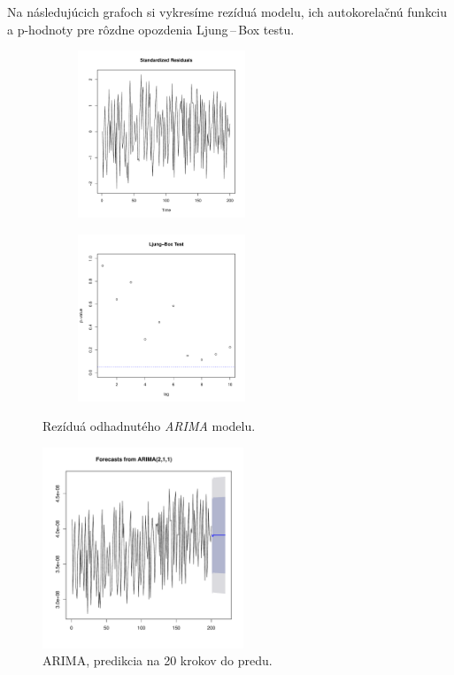 \documentclass[12pt,a4paper,oneside,final]{article}
\theoremstyle{definition}
\theoremstyle{remark}
\numberwithin{equation}{section}
\begin{document}
Na následujúcich grafoch si vykresíme rezíduá modelu, ich autokorelačnú funkciu a p-hodnoty
pre rôzdne opozdenia Ljung\,--\,Box testu.

\begin{figure}[H] \centering
    \begin{subfigure}{0.55\textwidth}
        \centering
        \includegraphics[width=1\linewidth,height=5cm]{images/heap_resid.pdf}
        \label{obr:heap_resid_resid}
    \end{subfigure}
    \begin{subfigure}{0.55\textwidth}
        \centering
        \includegraphics[width=1\linewidth,height=5cm]{images/heap_box.pdf}
    \end{subfigure}
    \caption{Rezíduá odhadnutého \emph{ARIMA} modelu.}
     \label{obr:heap_resid}
\end{figure}

\begin{figure}[H]
    \begin{center}
        \includegraphics[width=.8\textwidth,height=6cm]{images/heap_forecast.pdf}
        \caption{ARIMA, predikcia na 20 krokov do predu.}
        \label{obr:heap_forecast}
    \end{center}
\end{figure}
\end{document}
